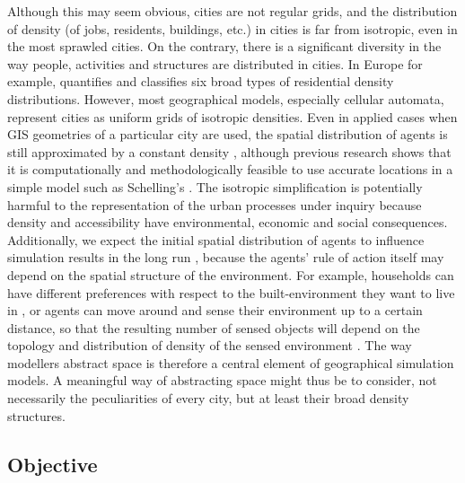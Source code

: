 \documentclass[Afour,sageh,times]{sagej}
\begin{document}
Although this may seem obvious, cities are not regular grids, and the distribution of density (of jobs, residents, buildings, etc.) in cities is far from isotropic, even in the most sprawled cities. On the contrary, there is a significant diversity in the way people, activities and structures are distributed in cities. In Europe for example, \citet{LeNechet2015} quantifies and classifies six broad types of residential density distributions. However, most geographical models, especially cellular automata, represent cities as uniform grids of isotropic densities. Even in applied cases when GIS geometries of a particular city are used, the spatial distribution of agents is still approximated by a constant density \citep{arribas2014diverse}, although previous research shows that it is computationally and methodologically feasible to use accurate locations in a simple model such as Schelling's \citep{benenson2002entity}. The isotropic simplification is potentially harmful to the representation of the urban processes under inquiry because density and accessibility have environmental, economic and social consequences. Additionally, we expect the initial spatial distribution of agents to influence simulation results in the long run \citep{Castellanoetal2009}, because the agents' rule of action itself may depend on the spatial structure of the environment. For example, households can have different preferences with respect to the built-environment they want to live in \citep{SpielmanHarrison2014}, or agents can move around and sense their environment up to a certain distance, so that the resulting number of sensed objects will depend on the topology \citep{Banos2012} and distribution of density of the sensed environment \citep{LauriJaggi2003, FossettDietrich2009}. The way modellers abstract space is therefore a central element of geographical simulation models. A meaningful way of abstracting space might thus be to consider, not necessarily the peculiarities of every city, but at least their broad density structures.

\subsection{Objective}
\end{document}
